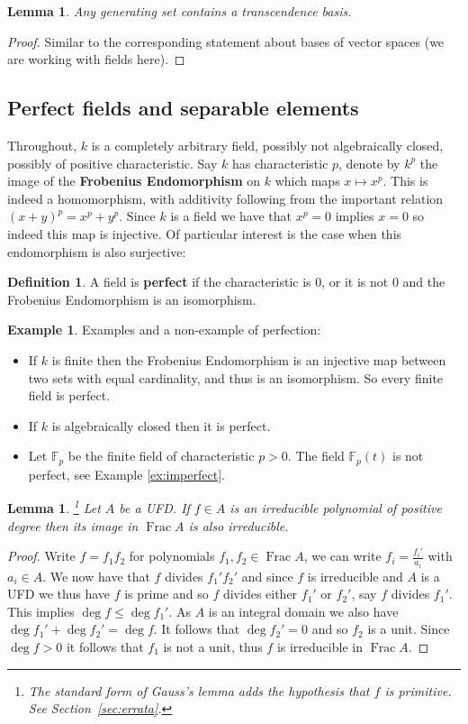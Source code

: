 \documentclass[12pt]{article}
\theoremstyle{plain}
\newtheorem{lemma}[thm]{Lemma}
\theoremstyle{definition}
\newtheorem{defn}[thm]{Definition} %
\newtheorem{example}[thm]{Example}
\newcommand{\bb}[1]{\mathbb{#1}}
\begin{document}
\begin{lemma}
Any generating set contains a transcendence basis.
\end{lemma}
\begin{proof}
Similar to the corresponding statement about bases of vector spaces (we are working with fields here).
\end{proof}
%
\subsection{Perfect fields and separable elements}
Throughout, $k$ is a completely arbitrary field, possibly not algebraically closed, possibly of positive characteristic.
Say $k$ has characteristic $p$, denote by $k^p$ the image of the \textbf{Frobenius Endomorphism} on $k$ which maps $x \mapsto x^p$. This is indeed a homomorphism, with additivity following from the important relation $(x + y)^p = x^p + y^p$. Since $k$ is a field we have that $x^p = 0$ implies $x = 0$ so indeed this map is injective. Of particular interest is the case when this endomorphism is also surjective:
\begin{defn}
A field is \textbf{perfect} if the characteristic is $0$, or it is not $0$ and the Frobenius Endomorphism is an isomorphism.
\end{defn}
\begin{example}
Examples and a non-example of perfection:
\begin{itemize}
    \item If $k$ is finite then the Frobenius Endomorphism is an injective map between two sets with equal cardinality, and thus is an isomorphism. So every finite field is perfect.
    \item If $k$ is algebraically closed then it is perfect.
    \item Let $\bb{F}_p$ be the finite field of characteristic $p > 0$. The field $\bb{F}_p(t)$ is not perfect, see Example \ref{ex:imperfect}.
\end{itemize}
\end{example}
\begin{lemma}
\label{lem:irred_UFD}\footnote{The standard form of Gauss's lemma adds the hypothesis that $f$ is primitive. See Section~\ref{sec:errata}.}
Let $A$ be a UFD. If $f \in A$ is an irreducible polynomial of positive degree then its image in $\operatorname{Frac}A$ is also irreducible.
\end{lemma}
\begin{proof}
Write $f = f_1f_2$ for polynomials $f_1,f_2 \in \operatorname{Frac}A$, we can write $f_i = \frac{f_i'}{a_i}$ with $a_i \in A$. We now have that $f$ divides $f_1'f_2'$ and since $f$ is irreducible and $A$ is a UFD we thus have $f$ is prime and so $f$ divides either $f_1'$ or $f_2'$, say $f$ divides $f_1'$. This implies $\operatorname{deg}f \leq \operatorname{deg}f_1'$.  As $A$ is an integral domain we also have $\operatorname{deg}f_1' + \operatorname{deg}f_2' = \operatorname{deg}f$. It follows that $\operatorname{deg}f_2' = 0$ and so $f_2$ is a unit. Since $\operatorname{deg}f > 0$ it follows that $f_1$ is not a unit, thus $f$ is irreducible in $\operatorname{Frac}A$.
\end{proof}
\end{document}
